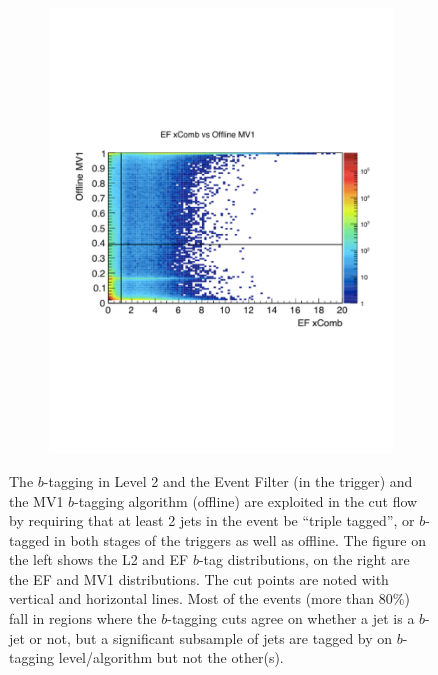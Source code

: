 \begin{figure}
	\begin{subfigure}[EF and MV1 $b$-tags]{0.45\textwidth}\includegraphics[width=\textwidth]{TriggerCuts/EF_MV1.pdf}\end{subfigure}
    \caption{The $b$-tagging in Level 2 and 
    the Event Filter (in the trigger) and the MV1 $b$-tagging algorithm
    (offline) are exploited in the cut flow by requiring that at least
    2 jets in the event be ``triple tagged'', or $b$-tagged in both
    stages of the triggers as well as offline.  The figure on the
    left shows the L2 and EF $b$-tag distributions, on the right are the
    EF and MV1 distributions.  The cut points are noted with vertical
    and horizontal lines.  Most of the events (more than 80\%) fall
    in regions where the $b$-tagging cuts agree on whether a jet is 
    a $b$-jet or not, but a significant subsample of jets are tagged by 
    on $b$-tagging level/algorithm but not the other(s). \label{fig:L2_EF}}
\end{figure}

